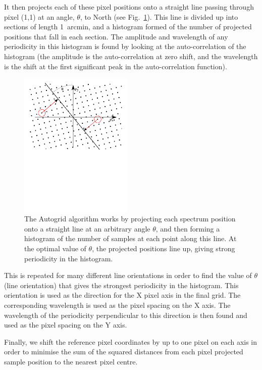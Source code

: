 \documentclass[final,authoryear,5p,times,twocolumn]{elsarticle}
\begin{document}
It then projects each of these pixel positions onto a straight line
passing through pixel (1,1) at an angle, $\theta$, to North (see
Fig.~\ref{fig:autogrid}). This line is divided up into sections of
length 1~arcmin, and a histogram formed of the number of projected
positions that fall in each section. The amplitude and wavelength of
any periodicity in this histogram is found by looking at the
auto-correlation of the histogram (the amplitude is the
auto-correlation at zero shift, and the wavelength is the shift at the
first significant peak in the auto-correlation function).

\begin{figure}
\includegraphics[width=0.48\textwidth]{autogrid}
\caption{The Autogrid algorithm works by projecting each spectrum
  position onto a straight line at an arbitrary angle $\theta$, and then
  forming a histogram of the number of samples at each point along
  this line. At the optimal value of $\theta$, the projected positions
  line up, giving strong periodicity in the histogram.}
\label{fig:autogrid}
\end{figure}

This is repeated for many different line orientations in order to find
the value of $\theta$ (line orientation) that gives the strongest
periodicity in the histogram. This orientation is used as the
direction for the X pixel axis in the final grid. The corresponding
wavelength is used as the pixel spacing on the X axis. The wavelength
of the periodicity perpendicular to this direction is then found and
used as the pixel spacing on the Y axis.

Finally, we shift the reference pixel coordinates by up to one pixel
on each axis in order to minimise the sum of the squared distances
from each pixel projected sample position to the nearest pixel centre.
\end{document}
